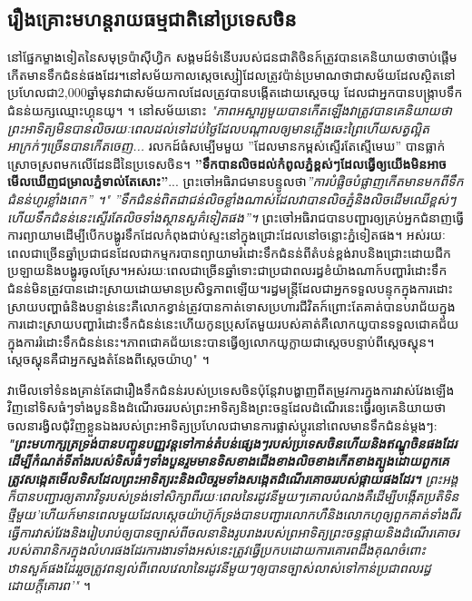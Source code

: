 \documentclass[10pt,twocolumn,letterpaper]{article}
\begin{document}
\subsection{រឿងគ្រោះមហន្តរាយធម្មជាតិនៅប្រទេសចិន}

នៅផ្នែកម្ខាងទៀតនៃសមុទ្រប៉ាស៊ីហ្វិក សង្គមដ៍ទំនើបរបស់ជនជាតិចិនក៍ត្រូវបានគេនិយាយថាចាប់ផ្តើមកើតមានទឹកជំនន់ផងដែរ។​នៅសម័យកាលស្តេចស្សៀដែលត្រូវប៉ាន់ប្រមាណថាជាសម័យដែលស្ថិតនៅប្រហែលជា2,000ឆ្នាំមុន​​​វាជាសម័យកាលដែលត្រូវបានបង្កើតដោយស្តេចយូ ដែលជាអ្នកបានបង្ក្រាបទឹកជំនន់យក្សឈ្មោះ​ហ្គុន​យូ។  \cite{6}។ នៅសម័យនោះ \textit{"ភាពអស្ចារ្យមួយបានកើតឡើង​វាត្រូវបានគេនិយាយថាព្រះអាទិត្យមិនបានលិចរយៈពេលដល់ទៅដប់ថ្ងៃ​ដែលបណ្តាលឲ្យមានភ្លើងឆេះព្រៃ​ហើយសត្វល្អិតអាក្រក់ៗច្រើនបានកើតចេញ...} រលកដ៍ធំសម្បើមមួយ ''ដែលមានកម្ពស់ស្ទើរតែស្មើមេឃ'' បានធ្លាក់ស្រោចស្រពមកលើដែនដីនៃប្រទេសចិន។ \textbf{''ទឹកបានលិចដល់កំពូលភ្នំខ្ពស់ៗ​ដែលធ្វើឲ្យយើងមិនអាចមើលឃើញជម្រាលភ្នំទាល់តែសោះ''}... ព្រះចៅអធិរាជមានបន្ទូលថា\textit{''ការបំផ្លិចបំផ្លាញកើតមានមកពីទឹកជំនន់ហូរខ្លាំងពេក'' ។"} \textit{''ទឹកជំនន់ពិតជាជន់លិចខ្លាំងណាស់ដែលវាបានលិចភ្នំនិងលិចដើមឈើខ្ពស់ៗ​ហើយទឹកជំនន់នេះស្ទើរតែលិចទាំងស្ថានសួគ៌ទៀតផង''។} ព្រះចៅអធិរាជបានបញ្ជារឲ្យគ្រប់អ្នកជំនាញធ្វើការព្យាយាមដើម្បីបើកបង្ហូរទឹកដែលកំពុងជាប់ស្ទះនៅក្នុងជ្រោះដែលនៅចន្លោះភ្នំទៀតផង។ អស់រយៈពេលជាច្រើនឆ្នាំប្រជាជនដែលជាកម្មករបានព្យាយាមរំដោះទឹកជំនន់ពីតំបន់ខ្ពង់រាបនិងជ្រោះដោយជីកប្រឡាយនិងបង្ហូរចូលស្រែ។អស់រយៈពេលជាច្រើនឆ្នាំទោះជាប្រជាពលរដ្ធខំយ៉ាងណាក៍បញ្ហារំដោះទឹកជំនន់មិនត្រូវបានដោះស្រាយដោយមានប្រសិទ្ធភាពឡើយ។​រដ្ធមន្ត្រីដែលជាអ្នកទទួលបន្ទុកក្នុងការដោះស្រាយបញ្ហាធំនិងបន្ទាន់នេះគឺលោកខ្វាន់ត្រូវបានកាត់ទោសប្រហារជីវិតក៍ព្រោះតែគាត់បានបរាជ័យក្នុងការដោះស្រាយបញ្ហារំដោះទឹកជំនន់នេះ​​​ហើយកូនប្រុសតែមួយរបស់គាត់គឺលោកយូបានទទួលជោគជ័យក្នុងការរំដោះទឹកជំនន់នេះ។​ភាពជោគជ័យនេះបានធ្វើឲ្យលោកយូក្លាយជាស្តេចបន្ទាប់ពីស្តេចស្ហុន។សេ្តចស្ហុនគឺជាអ្នកស្នងតំនែងពីសេ្តចយ៉ាហូ" \cite{5}។

 វាមើលទៅទំនងគ្រាន់តែជារឿងទឹកជំនន់របស់ប្រទេសចិន​ប៉ុន្តែវាបង្ហាញពីតម្រូវការក្នុងការវាស់វែងឡើងវិញនៅទិសធំៗទាំងបួន​និង​ដំណើរចររបស់ព្រះអាទិត្យនិងព្រះចន្ទ​ដែលដំណើរនេះធ្វើរឲ្យគេនិយាយថាចលនារង្វិលជុំវិញខ្លួនឯងរបស់ព្រះអាទិត្យប្រហែលជាមានការផ្លាស់ប្តូរនៅពេលមានទឹកជំនន់ម្តងៗ: \textit{\textbf{"ព្រះមហាក្សត្រទ្រង់បានបញ្ចូនបញ្ញវន្តទៅកាន់តំបន់ផ្សេងៗរបស់ប្រទេសចិន​ហើយនិងឥណ្ឌូចិនផងដែរ​ដើម្បីកំណត់ទីតាំងរបស់ទិសធំៗទាំងបួនរួមមានទិស​ខាងជើង​ខាងលិច​ខាងកើត​ខាងត្បូង​ដោយពួកគេត្រូវសង្កេតមើលទិសដែលព្រះអាទិត្យរះនិងលិច​រួមទាំងសង្កេតដំណើរគោចររបស់ផ្កាយផងដែរ។} ព្រះអង្គក៏បានបញ្ជារឲ្យតារាវិទូរបស់ទ្រង់ទៅសិក្សាពីរយៈពេលនៃរដូវនីមួយៗ​គោលបំណងគឺដើម្បីបង្កើតប្រតិទិនថ្មីមួយ​​​'ហើយក៍មានពេលមួយដែលស្តេចយ៉ាហ៊ូក៍ទ្រង់បានបញ្ជារលោក​ហឺ​និង​លោកហូឲ្យពួកគាត់ទាំងពីរធ្វើការវាស់វែងនិងរៀបរាប់ឲ្យបានច្បាស់ពីចលនា​និង​រូបរាងរបស់ព្រអាទិត្យ​ព្រះចន្ទ​ផ្កាយ​និង​ដំណើរគោចររបស់តារានិករក្នុងលំហរផងដែរការងារទាំងអស់នេះត្រូវធ្វើប្រកបដោយការគោរពដឹងគុណចំពោះឋានសួគ៍ផងដែរ​រួចត្រូវពន្យល់ពីពេលវេលានៃរដូវនីមួយៗឲ្យបានច្បាស់លាស់ទៅកាន់ប្រជាពលរដ្ធដោយក្តីគោរព​'"} \cite{5}។
\end{document}
